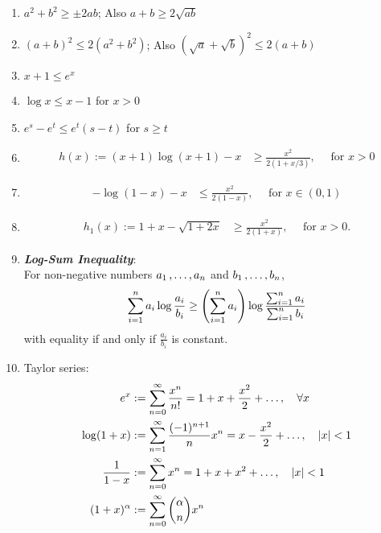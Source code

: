 \documentclass[11pt]{article}
\begin{document}
\begin{itemize}
\begin{remark}
\begin{enumerate}
\item $a^2 + b^2 \ge \pm 2ab$; Also $a + b \ge 2\sqrt{ab}$
\item  $(a + b)^2 \le 2(a^2 + b^2)$; Also $(\sqrt{a} + \sqrt{b})^2 \le 2(a + b)$
\item $x + 1 \le e^x$ 
\item $\log x \le x - 1$ for $x > 0$ 
\item $e^s - e^t \le e^t(s - t)$  for $s \ge t$
\item \begin{align*}
h(x) := (x + 1)\log(x + 1) - x &\ge \frac{x^2}{2(1 + x/3)}, \quad \text{ for }x >0 
\end{align*} 
\item \begin{align*}
-\log(1- x) - x &\le \frac{x^2}{2(1 - x)}, \quad \text{ for }x \in (0, 1) 
\end{align*}
\item \begin{align*}
h_1(x) := 1 + x - \sqrt{1 + 2x} &\ge \frac{x^2}{2(1 + x)}, \quad \text{ for }x > 0.
\end{align*}
\item \textbf{\emph{Log-Sum Inequality}}:\\
 For non-negative numbers $a_1 \,{,}\ldots{,}\, a_n$ and $b_1 \,{,}\ldots{,}\, b_n$,
\begin{align*}
\sum_{i=1}^{n}a_i \log\frac{a_i}{b_i} \ge \left(\sum_{i=1}^{n}a_i\right) \log\frac{\sum_{i=1}^{n}a_i}{\sum_{i=1}^{n}b_i} 
\end{align*} with equality if and only if $\frac{a_i}{b_i}$ is constant.
\item Taylor series: 
\begin{align*}
e^x &:= \sum_{n=0}^{\infty} \frac{x^n}{n!} = 1+ x + \frac{x^2}{2} + \ldots, \quad \forall x \\
\log(1 + x) &:= \sum_{n=1}^{\infty}\frac{(-1)^{n+1}}{n}x^n = x - \frac{x^2}{2} + \ldots, \quad \left\lvert x \right\rvert < 1\\
\frac{1}{1 - x}&:=  \sum_{n=0}^{\infty} x^n = 1 + x + x^2 + \ldots, \quad \left\lvert x \right\rvert < 1\\
(1 + x)^{\alpha} &:= \sum_{n=0}^{\infty}{\alpha \choose n} x^n
\end{align*}
\end{enumerate}
\end{remark}
\end{itemize}
\end{document}
